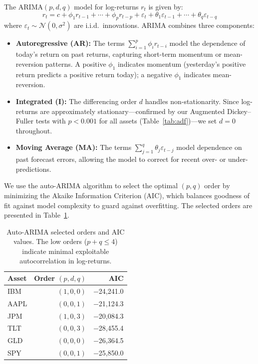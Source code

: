 \documentclass[11pt,a4paper]{article}
\begin{document}
The ARIMA$(p,d,q)$ model for log-returns $r_t$ is given by:
\begin{equation}
\label{eq:arima}
r_t = c + \phi_1 r_{t-1} + \cdots + \phi_p r_{t-p} + \varepsilon_t + \theta_1 \varepsilon_{t-1} + \cdots + \theta_q \varepsilon_{t-q}
\end{equation}
where $\varepsilon_t \sim \mathcal{N}(0, \sigma^2)$ are i.i.d.\ innovations.
ARIMA combines three components:
\begin{itemize}[leftmargin=1.5em]
    \item \textbf{Autoregressive (AR):} The terms $\sum_{i=1}^{p} \phi_i r_{t-i}$ model the dependence of today's return on past returns, capturing short-term momentum or mean-reversion patterns. A positive $\phi_1$ indicates momentum (yesterday's positive return predicts a positive return today); a negative $\phi_1$ indicates mean-reversion.
    \item \textbf{Integrated (I):} The differencing order $d$ handles non-stationarity. Since log-returns are approximately stationary---confirmed by our Augmented Dickey--Fuller tests with $p < 0.001$ for all assets (Table~\ref{tab:adf})---we set $d = 0$ throughout.
    \item \textbf{Moving Average (MA):} The terms $\sum_{j=1}^{q} \theta_j \varepsilon_{t-j}$ model dependence on past forecast errors, allowing the model to correct for recent over- or under-predictions.
\end{itemize}

We use the auto-ARIMA algorithm \citep{hyndman2008} to select the optimal $(p, q)$ order by minimizing the Akaike Information Criterion (AIC), which balances goodness of fit against model complexity to guard against overfitting.
The selected orders are presented in Table~\ref{tab:arima_orders}.

\begin{table}[H]
\centering
\caption{Auto-ARIMA selected orders and AIC values. The low orders ($p + q \leq 4$) indicate minimal exploitable autocorrelation in log-returns.}
\label{tab:arima_orders}
\small
\begin{tabular}{@{}lrr@{}}
\toprule
\textbf{Asset} & \textbf{Order $(p,d,q)$} & \textbf{AIC} \\
\midrule
IBM  & $(1,0,0)$ & $-$24{,}241.0 \\
AAPL & $(0,0,1)$ & $-$21{,}124.3 \\
JPM  & $(1,0,3)$ & $-$20{,}084.3 \\
TLT  & $(0,0,3)$ & $-$28{,}455.4 \\
GLD  & $(0,0,0)$ & $-$26{,}364.5 \\
SPY  & $(0,0,1)$ & $-$25{,}850.0 \\
\bottomrule
\end{tabular}
\end{table}
\end{document}
